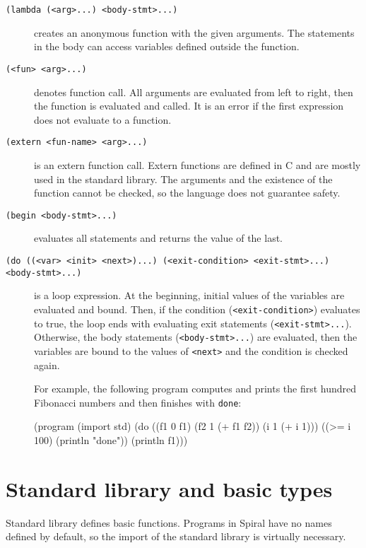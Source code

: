 \begin{description}
  \item[\texttt{(lambda (<arg>...) <body-stmt>...)}] creates an anonymous
    function with the given arguments. The statements in the body can access
    variables defined outside the function.

  \item[\texttt{(<fun> <arg>...)}] denotes function call. All arguments are
    evaluated from left to right, then the function is evaluated and called. It
    is an error if the first expression does not evaluate to a function.

  \item[\texttt{(extern <fun-name> <arg>...)}] is an extern function call.
    Extern functions are defined in C and are mostly used in the standard
    library. The arguments and the existence of the function cannot be checked,
    so the language does not guarantee safety.

  \item[\texttt{(begin <body-stmt>...)}] evaluates all statements and returns
    the value of the last.

  \item[\texttt{(do ((<var> <init> <next>)...) (<exit-condition> <exit-stmt>...)
    <body-stmt>...)}] is a loop expression. At the beginning, initial values of
    the variables are evaluated and bound. Then, if the condition
    (\texttt{<exit-condition>}) evaluates to true, the loop ends with evaluating
    exit statements (\texttt{<exit-stmt>...}). Otherwise, the body statements
    (\texttt{<body-stmt>...}) are evaluated, then the variables are bound to the
    values of \texttt{<next>} and the condition is checked again.

    For example, the following program computes and prints the first hundred
    Fibonacci numbers and then finishes with \texttt{done}:

\begin{spiral}
(program
  (import std)
  (do ((f1 0 f1)
       (f2 1 (+ f1 f2))
       (i  1 (+ i 1)))
    ((>= i 100)
      (println "done"))
    (println f1)))
\end{spiral}
\end{description}

\section{Standard library and basic types}

Standard library defines basic functions. Programs in Spiral have no names
defined by default, so the import of the standard library is virtually
necessary.

